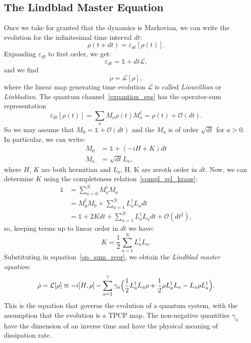 \subsection{The Lindblad Master Equation}
Once we take for granted that the dynamics is Markovian, we can write the evolution for the infinitesimal time interval $dt$:
\begin{equation}
    \rho(t+dt) = \varepsilon_{dt}[\rho(t)].
\end{equation}
Expanding $\varepsilon_{dt}$ to first order, we get:
\begin{equation}
\label{expantion_eps}
    \varepsilon_{dt} = \mathds{1} + dt\mathcal{L},
\end{equation}
and we find
\begin{equation}
    \Dot{\rho} = \mathcal{L}[\rho],
\end{equation}
where the linear map generating time evolution $\mathcal{L}$ is called \emph{Liouvillian} or \emph{Linbladian}. 
The quantum channel~\ref{expantion_eps} has the operator-sum representation
\begin{equation}
\label{op_sum_repr}
    \varepsilon_{dt}[\rho(t)] = \sum_a M_a \rho(t) M_a^\dagger = \rho(t) + \mathcal{O}(dt).
\end{equation}
So we may assume that $M_0 = \mathds{1} + \mathcal{O}(dt)$ and the $M_a$ is of order $\sqrt{dt}$ for $a>0$. In particular, we can write:
\begin{align}
    M_0 &= \mathds{1} + (-iH+K)dt \\
    M_a &= \sqrt{dt}L_a,
\end{align}
where $H$, $K$ are both hermitian and $L_a$, H, K are zeroth order in $dt$.
Now, we can determine $K$ using the completeness relation~\ref{compl_rel_kraus}:
\begin{align}
    \mathds{1} &= \sum_{a=0}^N M_a^\dagger M_a \\
               &= M_0^\dagger M_0 + \sum_{a=1}^N L_a^\dagger L_a dt \\
               &= \mathds{1} +2Kdt + \sum_{a=1}^N L_a^\dagger L_a dt + \mathcal{O}(dt^2),
\end{align}
so, keeping terms up to linear order in $dt$ we have:
\begin{equation*}
    K = \frac{1}{2} \sum_{a=1}^N L_a^\dagger L_a.
\end{equation*}
Substituting in equation~\ref{op_sum_repr}, we obtain the \emph{Lindblad master equation}:
\begin{equation}
\label{eqn:lindblad_eqn}
    \dot{\rho} = \mathcal{L}[\rho] \equiv -i[H, \rho] - \sum_{a=1}^? \gamma_a \Bigl(\frac{1}{2}L_a^{\dagger}L_a\rho + \frac{1}{2}\rho L_a^{\dagger}L_a - L_a\rho L_a^{\dagger}\Bigl).
\end{equation}
This is the equation that governs the evolution of a quantum system, with the assumption that the evolution is a TPCP map. The non-negative quantities $\gamma_a$ have the dimension of an inverse time and have the physical meaning of dissipation rate.

